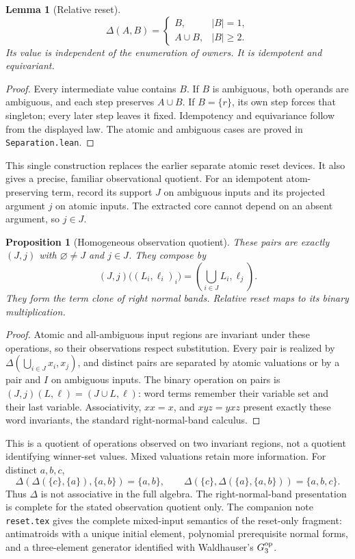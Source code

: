 \documentclass[11pt]{article}
\newtheorem{lemma}[theorem]{Lemma}
\newtheorem{proposition}[theorem]{Proposition}
\begin{document}
\begin{lemma}[Relative reset]\label{lem:relative}
\[
 \Delta(A,B)=
 \begin{cases}B,&|B|=1,\\A\cup B,&|B|\geq2.\end{cases}
\]
Its value is independent of the enumeration of owners. It is
idempotent and equivariant.
\end{lemma}
\begin{proof}
Every intermediate value contains $B$. If $B$ is ambiguous, both
operands are ambiguous, and each step preserves $A\cup B$. If
$B=\{r\}$, its own step forces that singleton; every later step leaves
it fixed. Idempotency and equivariance follow from the displayed law.
The atomic and ambiguous cases are proved in \texttt{Separation.lean}.
\end{proof}

This single construction replaces the earlier separate atomic reset
devices. It also gives a precise, familiar observational quotient.
For an idempotent atom-preserving term, record its support $J$ on
ambiguous inputs and its projected argument $j$ on atomic inputs.
The extracted core cannot depend on an absent argument, so $j\in J$.

\begin{proposition}[Homogeneous observation quotient]\label{prop:pointed}
These pairs are exactly $(J,j)$ with $\varnothing\ne J$ and $j\in J$.
They compose by
\[
 (J,j)\bigl((L_i,\ell_i)_i\bigr)
   =\left(\bigcup_{i\in J}L_i,\ell_j\right).
\]
They form the term clone of right normal bands. Relative reset maps to
its binary multiplication.
\end{proposition}
\begin{proof}
Atomic and all-ambiguous input regions are invariant under these
operations, so their observations respect substitution. Every pair is
realized by $\Delta(\bigcup_{i\in J}x_i,x_j)$, and distinct pairs are
separated by atomic valuations or by a pair and $I$ on ambiguous inputs.
The binary operation on pairs is $(J,j)(L,\ell)=(J\cup L,\ell)$:
word terms remember their variable set and their last variable.
Associativity, $xx=x$, and $xyz=yxz$ present exactly these word
invariants, the standard right-normal-band
calculus\cite[Section~8]{RomanowskaSmith1989}.
\end{proof}

This is a quotient of operations observed on two invariant regions,
not a quotient identifying winner-set values. Mixed valuations retain
more information. For distinct $a,b,c$,
\[
 \Delta(\Delta(\{c\},\{a\}),\{a,b\})=\{a,b\},\qquad
 \Delta(\{c\},\Delta(\{a\},\{a,b\}))=\{a,b,c\}.
\]
Thus $\Delta$ is not associative in the full algebra. The right-normal-band
presentation is complete for the stated observation quotient only.
The companion note \texttt{reset.tex} gives the complete mixed-input
semantics of the reset-only fragment: antimatroids with a unique initial
element, polynomial prerequisite normal forms, and a three-element
generator identified with Waldhauser's $G_3^{\rm op}$\cite{Waldhauser2006}.
\end{document}
